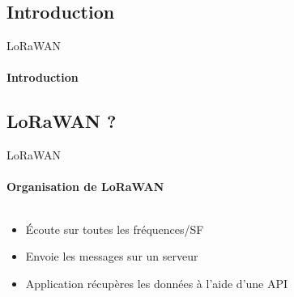 \subsection{Introduction}

\begin{frame}{LoRaWAN}
\framesubtitle{Introduction}

\end{frame}

\subsection{LoRaWAN ?}

\begin{frame}{LoRaWAN}
\framesubtitle{Organisation de LoRaWAN}
\begin{columns}
  \begin{column}{0.5\textwidth}
    \begin{itemize}
      \item Écoute sur toutes les fréquences/SF
      \item Envoie les messages sur un serveur
      \item Application récupères les données à l'aide d'une API
    \end{itemize}
  \end{column}
  \begin{column}{0.5\textwidth}
        
  \end{column}
\end{columns}
\end{frame}

